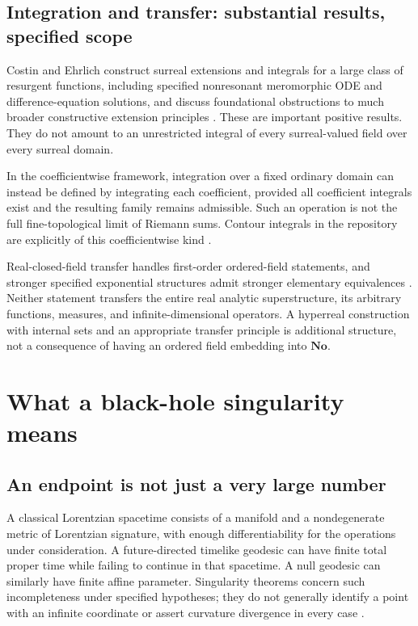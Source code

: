 \documentclass[11pt,a4paper]{article}
\numberwithin{equation}{section}
\theoremstyle{definition}
\theoremstyle{remark}
\newcommand{\No}{\mathbf{No}}
\begin{document}
\subsection{Integration and transfer: substantial results, specified scope}
Costin and Ehrlich construct surreal extensions and integrals for a large class of resurgent functions, including specified nonresonant meromorphic ODE and difference-equation solutions, and discuss foundational obstructions to much broader constructive extension principles \cite{CE}. These are important positive results. They do not amount to an unrestricted integral of every surreal-valued field over every surreal domain.

In the coefficientwise framework, integration over a fixed ordinary domain can instead be defined by integrating each coefficient, provided all coefficient integrals exist and the resulting family remains admissible. Such an operation is not the full fine-topological limit of Riemann sums. Contour integrals in the repository are explicitly of this coefficientwise kind \cite{Repo}.

Real-closed-field transfer handles first-order ordered-field statements, and stronger specified exponential structures admit stronger elementary equivalences \cite{vdDE}. Neither statement transfers the entire real analytic superstructure, its arbitrary functions, measures, and infinite-dimensional operators. A hyperreal construction with internal sets and an appropriate transfer principle is additional structure, not a consequence of having an ordered field embedding into $\No$.

\section{What a black-hole singularity means}
\label{sec:singularities}

\subsection{An endpoint is not just a very large number}
A classical Lorentzian spacetime consists of a manifold and a nondegenerate metric of Lorentzian signature, with enough differentiability for the operations under consideration. A future-directed timelike geodesic can have finite total proper time while failing to continue in that spacetime. A null geodesic can similarly have finite affine parameter. Singularity theorems concern such incompleteness under specified hypotheses; they do not generally identify a point with an infinite coordinate or assert curvature divergence in every case \cite{Senovilla}.
\end{document}

